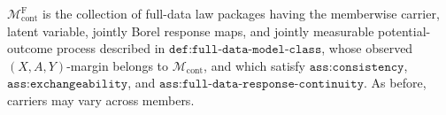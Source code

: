 \(\mathcal M_{\mathrm{cont}}^{\mathrm F}\) is the collection of full-data law packages having the memberwise carrier, latent variable, jointly Borel response maps, and jointly measurable potential-outcome process described in \(\texttt{def:full-data-model-class}\), whose observed \((X,A,Y)\)-margin belongs to \(\mathcal M_{\mathrm{cont}}\), and which satisfy \(\texttt{ass:consistency}\), \(\texttt{ass:exchangeability}\), and \(\texttt{ass:full-data-response-continuity}\).  As before, carriers may vary across members.